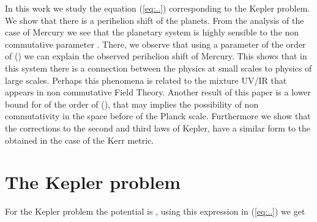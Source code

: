 \documentclass[a4paper,12pt]{article}
\providecommand{\rof}[1]{(\ref{eq:#1})}
\begin{document}
In this work we study the equation \rof{..} corresponding to the
Kepler problem. We show that there is a perihelion shift of the
planets. From the analysis of the case of Mercury we see that the
planetary system is highly sensible to the non commutative
parameter \coordHE{}. There, we observe that using a parameter
of the order of \coordHE{} (\coordHE{}) we can explain the observed perihelion shift of
Mercury. This shows that in this system there is a connection
between the physics at small scales to physics of large scales.
Perhaps this phenomena is related to the mixture UV/IR that
appears in non commutative Field Theory. Another result of this
paper is a lower bound for \myHighlight{$\Theta$}\coordHE{} of the order of \coordHE{}
(\coordHE{}), that may
implies the possibility of non commutativity in the space before
of the Planck scale. Furthermore we show that the corrections to
the second and third laws of Kepler, have a similar form to the
obtained in the case of the Kerr metric.




\section{The Kepler problem}
For the Kepler problem the potential is  \coordHE{},
using  this expression in \rof{..} we get
\end{document}
